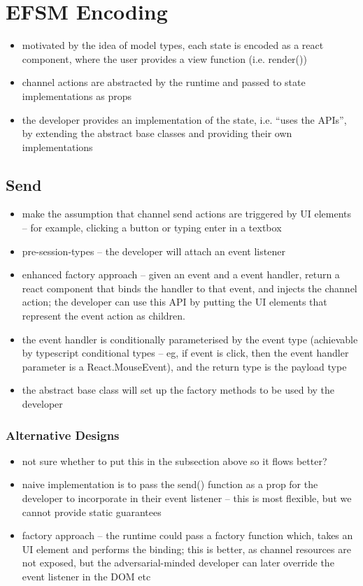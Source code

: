 \section{EFSM Encoding}

\begin{itemize}
\item motivated by the idea of model types, each state is encoded as a react component, where the user provides a view function (i.e. render())
\item channel actions are abstracted by the runtime and passed to state implementations as props
\item the developer provides an implementation of the state, i.e. ``uses the APIs'', by extending the abstract base classes and providing their own implementations
\end{itemize}

\subsection{Send}
\begin{itemize}
\item make the assumption that channel send actions are triggered by UI elements -- for example, clicking a button or typing enter in a textbox
\item pre-session-types -- the developer will attach an event listener
\item enhanced factory approach -- given an event and a event handler, return a react component that binds the handler to that event, and injects the channel action; the developer can use this API by putting the UI elements that represent the event action as children.
\item the event handler is conditionally parameterised by the event type (achievable by typescript conditional types -- eg, if event is click, then the event handler parameter is a React.MouseEvent), and the return type is the payload type
\item the abstract base class will set up the factory methods to be used by the developer
\end{itemize}

\subsubsection{Alternative Designs}
\begin{itemize}
\item not sure whether to put this in the subsection above so it flows better?
\item naive implementation is to pass the send() function as a prop for the developer to incorporate in their event listener -- this is most flexible, but we cannot provide static guarantees
\item factory approach -- the runtime could pass a factory function which, takes an UI element and performs the binding; this is better, as channel resources are not exposed, but the adversarial-minded developer can later override the event listener in the DOM etc
\end{itemize}

